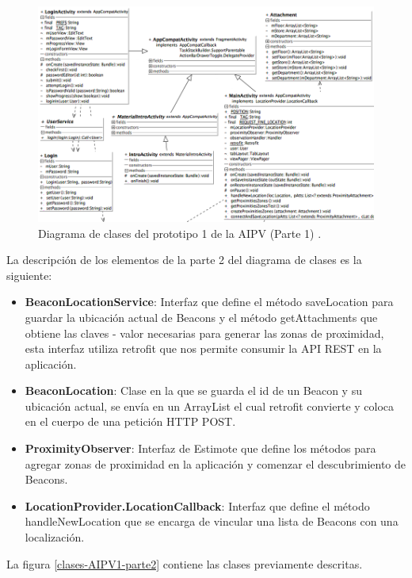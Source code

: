 \FloatBarrier
\begin{figure}[htbp!]
		\centering
			\includegraphics[width=1 \textwidth]{imagenes/adrian/vendedor/prototipo1/clases_1}
		\caption{Diagrama de clases del prototipo 1 de la AIPV (Parte 1) .}
		\label{clases-AIPV1-parte1}
\end{figure}
\FloatBarrier

La descripción de los elementos de la parte 2 del diagrama de clases es la siguiente: 

\begin{itemize}
\item \textbf{BeaconLocationService}: Interfaz que define el método saveLocation para guardar la ubicación actual de Beacons y el método getAttachments que obtiene las claves - valor necesarias para generar las zonas de proximidad, esta interfaz utiliza retrofit que nos permite consumir la API REST en la aplicación.
\item \textbf{BeaconLocation}: Clase en la que se guarda el id de un Beacon y su ubicación actual, se envía en un ArrayList el cual retrofit convierte y coloca en el cuerpo de una petición HTTP POST.
\item \textbf{ProximityObserver}: Interfaz de Estimote que define los métodos para agregar zonas de proximidad en la aplicación y comenzar el descubrimiento de Beacons.
\item \textbf{LocationProvider.LocationCallback}: Interfaz que define el método handleNewLocation que se encarga de vincular una lista de Beacons con una localización.

\end{itemize}

La figura \ref{clases-AIPV1-parte2} contiene las clases previamente descritas.

